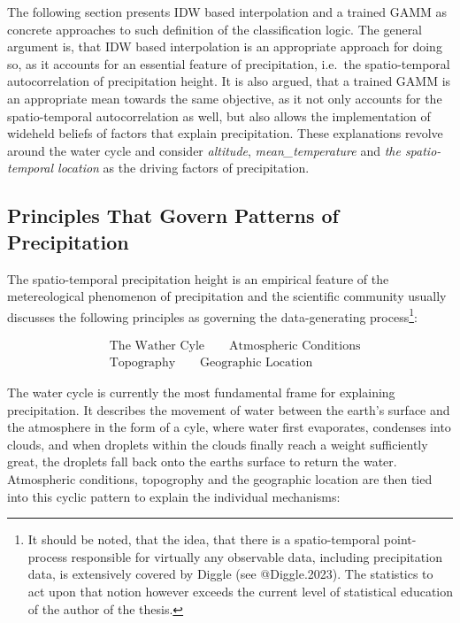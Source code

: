 \documentclass[
  12pt,
]{article}
\begin{document}
The following section presents IDW based interpolation and a trained
GAMM as concrete approaches to such definition of the classification
logic. The general argument is, that IDW based interpolation is an
appropriate approach for doing so, as it accounts for an essential
feature of precipitation, i.e.~the spatio-temporal autocorrelation of
precipitation height. It is also argued, that a trained GAMM is an
appropriate mean towards the same objective, as it not only accounts for
the spatio-temporal autocorrelation as well, but also allows the
implementation of wideheld beliefs of factors that explain
precipitation. These explanations revolve around the water cycle and
consider \textit{altitude}, \textit{mean\_temperature} and
\textit{the spatio-temporal location} as the driving factors of
precipitation.

\hypertarget{principles-that-govern-patterns-of-precipitation}{%
\subsection{Principles That Govern Patterns of
Precipitation}\label{principles-that-govern-patterns-of-precipitation}}

\begingroup
\justify

The spatio-temporal precipitation height is an empirical feature of the
metereological phenomenon of precipitation and the scientific community
usually discusses the following principles as governing the
data-generating
process\footnote{It should be noted, that the idea, that there is a spatio-temporal point-process responsible for virtually any observable data, including precipitation data, is extensively covered by Diggle (see @Diggle.2023). The statistics to act upon that notion however exceeds the current level of statistical education of the author of the thesis.}:
\endgroup

\vspace{-0.75cm}

\begin{align*}
& \text{The Wather Cyle}\qquad\text{Atmospheric Conditions} \\
& \text{Topography}\qquad\text{Geographic Location}
\end{align*}

\begingroup
\justify

The water cycle is currently the most fundamental frame for explaining
precipitation. It describes the movement of water between the earth's
surface and the atmosphere in the form of a cyle, where water first
evaporates, condenses into clouds, and when droplets within the clouds
finally reach a weight sufficiently great, the droplets fall back onto
the earths surface to return the water. Atmospheric conditions,
topogrophy and the geographic location are then tied into this cyclic
pattern to explain the individual mechanisms: \endgroup
\end{document}
